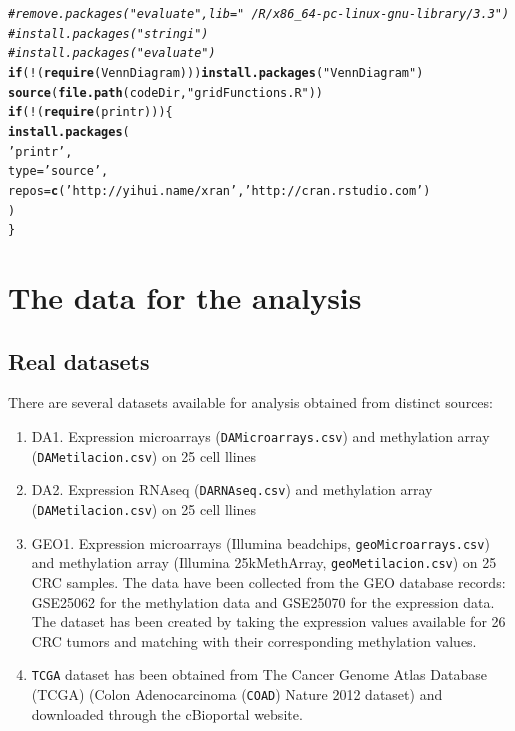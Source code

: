 \documentclass[a4paper,10pt]{article}\usepackage[]{graphicx}\usepackage[]{color}
\makeatletter
\newcommand{\hlstr}[1]{\textcolor[rgb]{0.192,0.494,0.8}{#1}}%
\newcommand{\hlcom}[1]{\textcolor[rgb]{0.678,0.584,0.686}{\textit{#1}}}%
\newcommand{\hlopt}[1]{\textcolor[rgb]{0,0,0}{#1}}%
\newcommand{\hlstd}[1]{\textcolor[rgb]{0.345,0.345,0.345}{#1}}%
\newcommand{\hlkwa}[1]{\textcolor[rgb]{0.161,0.373,0.58}{\textbf{#1}}}%
\newcommand{\hlkwc}[1]{\textcolor[rgb]{0.333,0.667,0.333}{#1}}%
\newcommand{\hlkwd}[1]{\textcolor[rgb]{0.737,0.353,0.396}{\textbf{#1}}}%
\newenvironment{kframe}{%
 \def\at@end@of@kframe{}%
 \ifinner\ifhmode%
  \def\at@end@of@kframe{\end{minipage}}%
  \begin{minipage}{\columnwidth}%
 \fi\fi%
 \def\FrameCommand##1{\hskip\@totalleftmargin \hskip-\fboxsep
 \colorbox{shadecolor}{##1}\hskip-\fboxsep
     \hskip-\linewidth \hskip-\@totalleftmargin \hskip\columnwidth}%
 \MakeFramed {\advance\hsize-\width
   \@totalleftmargin\z@ \linewidth\hsize
   \@setminipage}}%
 {\par\unskip\endMakeFramed%
 \at@end@of@kframe}
\newenvironment{knitrout}{}{} %
\makeatother
\begin{document}
\begin{knitrout}
\color{fgcolor}\begin{kframe}
\begin{alltt}
\hlcom{# remove.packages("evaluate", lib="~/R/x86_64-pc-linux-gnu-library/3.3")}
\hlcom{# install.packages("stringi")}
\hlcom{# install.packages("evaluate")}
\hlkwa{if} \hlstd{(}\hlopt{!}\hlstd{(}\hlkwd{require}\hlstd{(VennDiagram)))} \hlkwd{install.packages}\hlstd{(}\hlstr{"VennDiagram"}\hlstd{)}
\hlkwd{source}\hlstd{(}\hlkwd{file.path}\hlstd{(codeDir,} \hlstr{"gridFunctions.R"}\hlstd{))}
\hlkwa{if}\hlstd{(}\hlopt{!}\hlstd{(}\hlkwd{require}\hlstd{(printr))) \{}
  \hlkwd{install.packages}\hlstd{(}
    \hlstr{'printr'}\hlstd{,}
    \hlkwc{type} \hlstd{=} \hlstr{'source'}\hlstd{,}
    \hlkwc{repos} \hlstd{=} \hlkwd{c}\hlstd{(}\hlstr{'http://yihui.name/xran'}\hlstd{,} \hlstr{'http://cran.rstudio.com'}\hlstd{)}
  \hlstd{)}
\hlstd{\}}
\end{alltt}
\end{kframe}
\end{knitrout}

\section{The data for the analysis}

\subsection{Real datasets}

There are several datasets available for analysis obtained from distinct sources:
\begin{enumerate}
  \item DA1. Expression microarrays (\texttt{DAMicroarrays.csv}) and methylation array (\texttt{DAMetilacion.csv}) on 25 cell llines
  \item DA2. Expression RNAseq (\texttt{DARNAseq.csv}) and methylation array (\texttt{DAMetilacion.csv}) on 25 cell llines
  \item GEO1. Expression microarrays (Illumina beadchips, \texttt{geoMicroarrays.csv}) and methylation array (Illumina 25kMethArray, \texttt{geoMetilacion.csv}) on 25 CRC samples. The data have been collected from the GEO database records: GSE25062 for the methylation data and GSE25070 for the expression data. The dataset has been created by taking the expression values available for 26 CRC tumors and matching with their corresponding methylation values.
\item \texttt{TCGA} dataset has been obtained from The Cancer Genome Atlas Database (TCGA) (Colon Adenocarcinoma (\texttt{COAD}) Nature 2012 dataset) and downloaded through the cBioportal website.
\end{enumerate}
\end{document}
